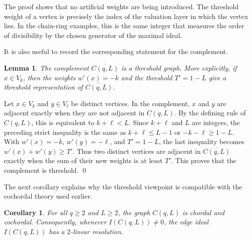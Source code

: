 \documentclass[12pt]{article}
\newtheorem{lemma}[theorem]{Lemma}
\newtheorem{corollary}[theorem]{Corollary}
\theoremstyle{definition}
\renewenvironment{proof}{{\bf \noindent Proof.}}{\qed}
\begin{document}
\medskip

The proof shows that no artificial weights are being introduced.  The threshold weight of a vertex is precisely the index of the valuation layer in which the vertex lies.  In the chain-ring examples, this is the same integer that measures the order of divisibility by the chosen generator of the maximal ideal.

\medskip

It is also useful to record the corresponding statement for the complement.

\medskip

\begin{lemma}\label{lem:CqL-complement-threshold}
	The complement $\overline{C(q,L)}$ is a threshold graph.  More explicitly, if $x\in V_k$, then the weights
	$ w'(x)=-k $
	and the threshold $T'=1-L$ give a threshold representation of $\overline{C(q,L)}$.
\end{lemma}

\begin{proof}
	Let $x\in V_k$ and $y\in V_\ell$ be distinct vertices.  In the complement, $x$ and $y$ are adjacent exactly when they are not adjacent in $C(q,L)$.  By the defining rule of $C(q,L)$, this is equivalent to
	$ k+\ell<L. $
	Since $k+\ell$ and $L$ are integers, the preceding strict inequality is the same as
	$ k+\ell\le L-1$ or 
	$ -k-\ell\ge 1-L. $
	With $w'(x)=-k$, $w'(y)=-\ell$, and $T'=1-L$, the last inequality becomes
	$ w'(x)+w'(y)\ge T'. $
	Thus two distinct vertices are adjacent in $\overline{C(q,L)}$ exactly when the sum of their new weights is at least $T'$.  This proves that the complement is threshold.
\end{proof}

\medskip

The next corollary explains why the threshold viewpoint is compatible with the cochordal theory used earlier.

\medskip

\begin{corollary}\label{cor:CqL-threshold-cochordal}
	For all $q\ge2$ and $L\ge2$, the graph $C(q,L)$ is chordal and cochordal.  Consequently, whenever $I(C(q,L))\ne0$, the edge ideal $I(C(q,L))$ has a $2$-linear resolution.
\end{corollary}
\end{document}
